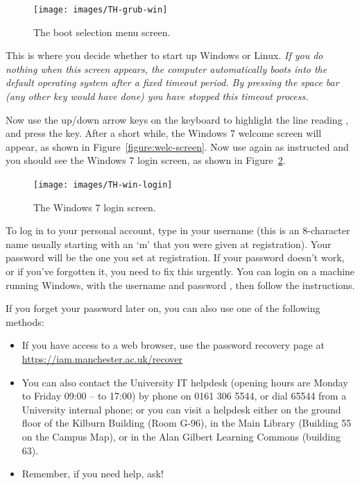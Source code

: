 \begin{figure}
\centerline{\texttt{[image: images/TH-grub-win]}}
\caption{The boot selection menu screen.}
\label{figure:welc-grub}
\end{figure}

This is where you decide whether to start up Windows or Linux. \emph{If you do nothing when this screen appears, the computer automatically boots into the default operating system after a fixed timeout period. By pressing the space bar (any other key would have done) you have stopped this timeout process. }

Now use the
up/down arrow keys on the keyboard to highlight the line
reading , and press the  key. After a short while, the Windows 7
welcome screen will appear, as shown in Figure~\ref{figure:welc-screen}. Now use   again as instructed and you should see the Windows 7 login screen, as shown in Figure~\ref{figure:login-screen}.

\begin{figure}
\centerline{\texttt{[image: images/TH-win-login]}}
\caption{The Windows 7 login screen.}
\label{figure:login-screen}
\end{figure}

To log in to your personal account, type in your username (this is an
8-character name usually starting with an `m' that you were given at registration). Your password will
be the one  you set at registration. If your password doesn't work, or if you've forgotten it,
you need to fix this urgently. You can login on a machine running Windows,  with the username  and password , then follow the instructions.

If you forget your password later on, you can also use one of the following methods:
\begin{itemize}
\item If you have access to a web browser, use the password recovery page at\\ \url{https://iam.manchester.ac.uk/recover}
\item You can also contact the University IT helpdesk (opening hours are Monday to Friday 09:00 -- to 17:00) by phone on 0161 306 5544, or dial 65544 from a University internal phone; or you can visit a helpdesk either on the ground floor of the Kilburn Building (Room G-96), in the Main Library (Building 55 on
the Campus Map), or in the Alan Gilbert Learning Commons (building 63).
\item Remember, if you need help, ask!
\end{itemize}

